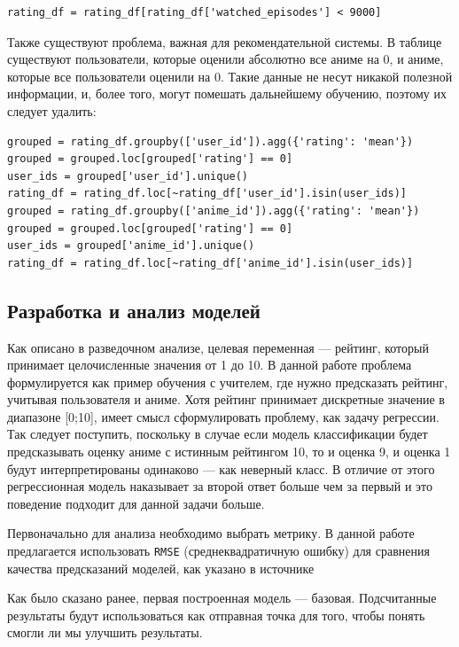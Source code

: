 \documentclass[bachelor, och, diploma]{SCWorks}
\begin{document}
\begin{verbatim}
rating_df = rating_df[rating_df['watched_episodes'] < 9000]
\end{verbatim}

Также существуют проблема, важная для рекомендательной системы. В таблице существуют пользователи, которые оценили абсолютно все аниме на 0, и аниме, которые все пользователи оценили на 0.  Такие данные не несут никакой полезной информации, и, более того, могут помешать дальнейшему обучению, поэтому их следует удалить:
\begin{verbatim}
grouped = rating_df.groupby(['user_id']).agg({'rating': 'mean'})
grouped = grouped.loc[grouped['rating'] == 0]
user_ids = grouped['user_id'].unique()
rating_df = rating_df.loc[~rating_df['user_id'].isin(user_ids)]
grouped = rating_df.groupby(['anime_id']).agg({'rating': 'mean'})
grouped = grouped.loc[grouped['rating'] == 0]
user_ids = grouped['anime_id'].unique()
rating_df = rating_df.loc[~rating_df['anime_id'].isin(user_ids)]
\end{verbatim}

\subsection{Разработка и анализ моделей}
Как описано в разведочном анализе, целевая переменная --- рейтинг, который принимает целочисленные значения от 1 до 10. В данной работе проблема формулируется как пример обучения с учителем, где нужно предсказать рейтинг, учитывая пользователя и аниме. Хотя рейтинг принимает дискретные значение в диапазоне [0;10], имеет смысл сформулировать проблему, как задачу регрессии. Так следует поступить, поскольку в случае если модель классификации будет предсказывать оценку аниме с истинным рейтингом 10, то и оценка 9,
 и оценка 1 будут интерпретированы одинаково --- как неверный класс. В отличие от этого регрессионная модель наказывает за второй ответ больше чем за первый и это поведение подходит для данной задачи больше.

Первоначально для анализа необходимо выбрать метрику. В данной работе предлагается использовать \verb|RMSE| (среднеквадратичную ошибку) для сравнения качества предсказаний  моделей, как указано в источнике 

Как было сказано ранее, первая построенная модель --- базовая. Подсчитанные результаты будут использоваться как отправная точка для того, чтобы понять смогли ли мы улучшить результаты.
\end{document}
